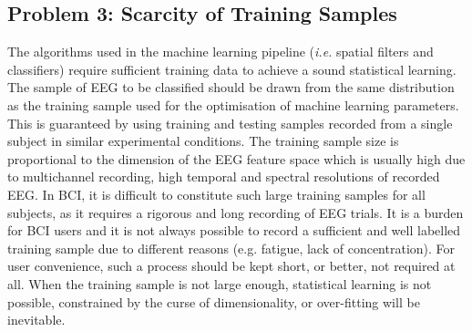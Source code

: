 \subsection*{Problem 3: Scarcity of Training Samples}

The algorithms used in the machine learning pipeline (\textit{i.e.} spatial filters and classifiers) require sufficient training data to achieve a sound statistical learning.
The sample of EEG to be classified should be drawn from the same distribution as the training sample used for the optimisation of machine learning parameters. 
This is guaranteed  by using training and testing samples recorded from a single subject in similar experimental conditions.
The training sample size is proportional to the dimension of the EEG feature space which is usually high due to multichannel recording, high temporal and spectral resolutions of recorded EEG.
In BCI, it is difficult to constitute such large training samples for all subjects, as it requires a rigorous and long recording of EEG trials. 
It is a burden for BCI users and it is not always possible to record a sufficient and well labelled training sample due to different reasons (e.g. fatigue, lack of concentration).
For user convenience, such a process should be kept short, or better, not required at all.  
When the training sample is not large enough, statistical learning is not possible, constrained by the curse of dimensionality, or over-fitting will be inevitable.
   
